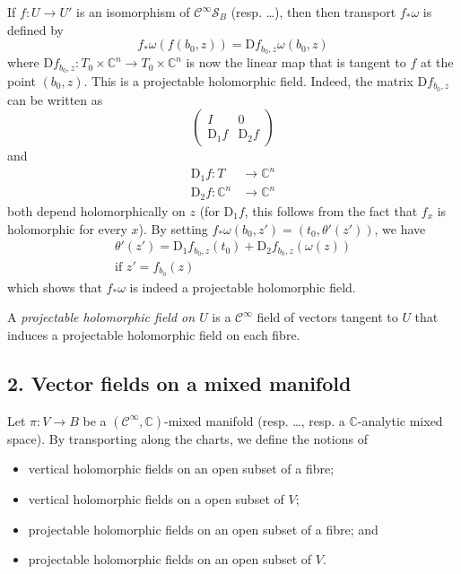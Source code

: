 \documentclass[british]{article}
\providecommand{\tightlist}{%
\setlength{\itemsep}{0pt}\setlength{\parskip}{0pt}}
\begin{document}
If \(f\colon U\to U'\) is an isomorphism of
\(\mathscr{C}^\infty\mathscr{S}_B\) (resp. \ldots), then then transport
\(f_*\omega\) is defined by \[
  f_*\omega(f(b_0,z)) = \mathrm{D}f_{b_0,z}\omega(b_0,z)
\] where
\(\mathrm{D}f_{b_0,z}\colon T_0\times\mathbb{C}^n\to T_0\times\mathbb{C}^n\)
is now the linear map that is tangent to \(f\) at the point \((b_0,z)\).
This is a projectable holomorphic field. Indeed, the matrix
\(\mathrm{D}f_{b_0,z}\) can be written as \[
  \begin{pmatrix}
    I & 0
  \\\mathrm{D}_1f & \mathrm{D}_2f
  \end{pmatrix}
\] and \[
  \begin{aligned}
    \mathrm{D}_1f\colon T &\to \mathbb{C}^n
  \\\mathrm{D}_2f\colon \mathbb{C}^n &\to \mathbb{C}^n
  \end{aligned}
\] both depend holomorphically on \(z\) (for \(\mathrm{D}_1f\), this
follows from the fact that \(f_x\) is holomorphic for every \(x\)). By
setting \(f_*\omega(b_0,z')=(t_0,\theta'(z'))\), we have \[
  \begin{gathered}
    \theta'(z') = \mathrm{D}_1f_{b_0,z}(t_0) + \mathrm{D}_2f_{b_0,z}(\omega(z))
  \\\text{if }z'=f_{b_0}(z)
  \end{gathered}
\] which shows that \(f_*\omega\) is indeed a projectable holomorphic
field.

A \emph{projectable holomorphic field on \(U\)} is a
\(\mathscr{C}^\infty\) field of vectors tangent to \(U\) that induces a
projectable holomorphic field on each fibre.

\subsection*{2. Vector fields on a mixed
manifold}\label{two-section-III.2}

Let \(\pi\colon V\to B\) be a \((\mathscr{C}^\infty,\mathbb{C})\)-mixed
manifold (resp. \ldots, resp. a \(\mathbb{C}\)-analytic mixed space). By
transporting along the charts, we define the notions of

\begin{itemize}
\tightlist
\item
  vertical holomorphic fields on an open subset of a fibre;
\item
  vertical holomorphic fields on a open subset of \(V\);
\item
  projectable holomorphic fields on an open subset of a fibre; and
\item
  projectable holomorphic fields on an open subset of \(V\).
\end{itemize}
\end{document}
